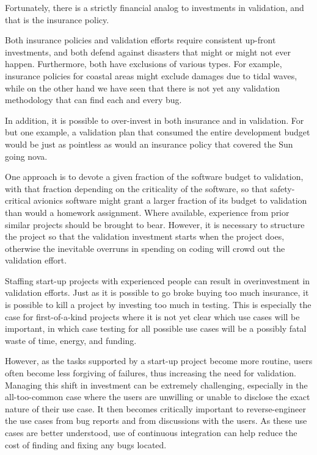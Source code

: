 Fortunately, there is a strictly financial analog to investments in
validation, and that is the insurance policy.


Both insurance policies and validation efforts require consistent
up-front investments, and both defend against disasters that might
or might not ever happen.
Furthermore, both have exclusions of various types.
For example, insurance policies for coastal areas might exclude
damages due to tidal waves, while on the other hand we have seen
that there is not yet any validation methodology that can find
each and every bug.

In addition, it is possible to over-invest in both insurance and
in validation.
For but one example, a validation plan that consumed the entire
development budget would be just as pointless as would an insurance
policy that covered the Sun going nova.

One approach is to devote a given fraction of the software budget to
validation, with that fraction depending on the criticality of the
software, so that safety-critical avionics software might grant a
larger fraction of its budget to validation than would a homework
assignment.
Where available, experience from prior similar projects should be
brought to bear.
However, it is necessary to structure the project so that the validation
investment starts when the project does, otherwise the inevitable overruns
in spending on coding will crowd out the validation effort.

Staffing start-up projects with experienced people can result in
overinvestment in validation efforts.
Just as it is possible to go broke buying too much insurance, it is
possible to kill a project by investing too much in testing.
This is especially the case for first-of-a-kind projects where it is
not yet clear which use cases will be important, in which case testing
for all possible use cases will be a possibly fatal waste of time,
energy, and funding.

However, as the tasks supported by a start-up project become more routine,
users often become less forgiving of failures, thus increasing the need
for validation.
Managing this shift in investment can be extremely challenging,
especially in the all-too-common case where the users are unwilling
or unable to disclose the exact nature of their use case.
It then becomes critically important to reverse-engineer the
use cases from bug reports and from discussions with the users.
As these use cases are better understood, use of continuous integration
can help reduce the cost of finding and fixing any bugs located.

